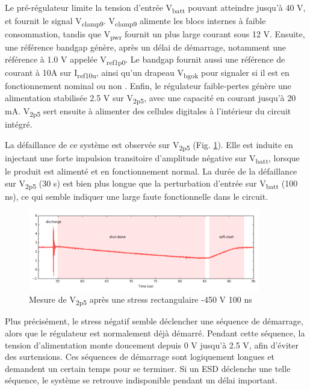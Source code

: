 Le pré-régulateur limite la tension d'entrée V\textsubscript{batt} pouvant atteindre jusqu'à 40 V, et fournit le signal V\textsubscript{clamp9}.
V\textsubscript{clamp9} alimente les blocs internes à faible consommation, tandis que V\textsubscript{pwr} fournit un plus large courant sous 12 V.
Ensuite, une référence bandgap génère, après un délai de démarrage, notamment une référence à 1.0 V appelée V\textsubscript{ref1p0}.
Le bandgap fournit aussi une référence de courant à 10\textMu{}A sur I\textsubscript{ref10u}, ainsi qu'un drapeau V\textsubscript{bgok} pour signaler si il est en fonctionnement nominal ou non .
Enfin, le régulateur faible-pertes génère une alimentation stabilisée 2.5 V sur V\textsubscript{2p5}, avec une capacité en courant jusqu'à 20 mA.
V\textsubscript{2p5} sert ensuite à alimenter des cellules digitales à l'intérieur du circuit intégré.

La défaillance de ce système est observée sur V\textsubscript{2p5} (Fig. \ref{fig:meas-reset-v2p5}).
Elle est induite en injectant une forte impulsion transitoire d'amplitude négative sur V\textsubscript{batt}, lorsque le produit est alimenté et en fonctionnement normal.
La durée de la défaillance sur V\textsubscript{2p5} (30 \textmu{}s) est bien plus longue que la perturbation d'entrée sur V\textsubscript{batt} (100 ns), ce qui semble indiquer une large faute fonctionnelle dans le circuit.

\begin{figure}[!h]
  \centering
  \includegraphics[width=0.9\textwidth]{src/1/figures/v2p5_measure.png}
  \caption{Mesure de V\textsubscript{2p5} après une stress rectangulaire -450 V 100 ns}
  \label{fig:meas-reset-v2p5}
\end{figure}

Plus précisément, le stress négatif semble déclencher une séquence de démarrage, alors que le régulateur est normalement déjà démarré.
Pendant cette séquence, la tension d'alimentation monte doucement depuis 0 V jusqu'à 2.5 V, afin d'éviter des surtensions.
Ces séquences de démarrage sont logiquement longues et demandent un certain temps pour se terminer.
Si un ESD déclenche une telle séquence, le système se retrouve indisponible pendant un délai important.

